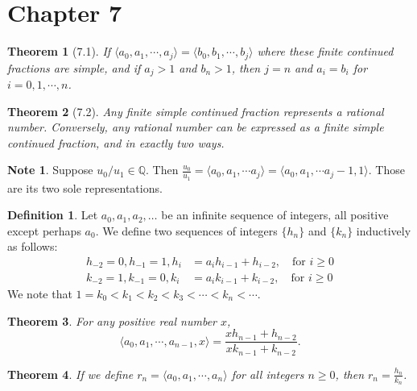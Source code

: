 \documentclass{amsart}
\newtheorem{theorem}{Theorem}
\theoremstyle{definition}
\newtheorem*{definition*}{Definition}
\newtheorem*{note*}{Note}
\begin{document}
\section*{Chapter 7}

\begin{theorem}[7.1]
  If
  $\langle a_0, a_1, \cdots, a_j \rangle 
  = \langle b_0, b_1, \cdots, b_j \rangle$
  where these finite continued fractions are simple,
  and if $a_j > 1$ and $b_n > 1$, then $j = n$ and
  $a_i = b_i$ for $i = 0, 1, \cdots, n$.
\end{theorem}

\begin{theorem}[7.2]
  Any finite simple continued fraction represents a rational 
  number. 
  Conversely, any rational number can be expressed as a finite
  simple continued fraction, and in exactly two ways. 
\end{theorem}

\begin{note*}
  Suppose $u_0 / u_1 \in \mathbb{Q}$.
  Then
  $\frac{u_0}{u_1} 
  = \langle a_0, a_1, \cdots a_j \rangle
  = \langle a_0, a_1, \cdots a_j - 1, 1 \rangle$.
  Those are its two sole representations.
\end{note*}

\begin{definition*}
  Let $a_0, a_1, a_2, \ldots$ be an infinite sequence
  of integers, all positive except perhaps $a_0$.
  We define two sequences of integers
  $\{ h_n \}$ and $\{ k_n \}$ inductively as follows:
  \begin{align*}
    h_{-2} = 0, h_{-1} = 1, h_i &= a_i h_{i-1} + h_{i-2}, 
      \quad \text{for $i \geq 0$} \\
      k_{-2} = 1, k_{-1} = 0, k_i &= a_i k_{i-1} + k_{i-2}, 
      \quad \text{for $i \geq 0$}
  \end{align*}
  We note that $1 = k_0 < k_1 < k_2 < k_3 < \cdots < k_n < \cdots$.
\end{definition*}

\begin{theorem}
  For any positive real number $x$,
  \[
    \langle a_0, a_1, \cdots, a_{n-1}, x \rangle
    = \frac{x h_{n-1} + h_{n-2}}{x k_{n-1} + k_{n-2}}.
 \]
\end{theorem}

\begin{theorem}
  If we define $r_n = \langle a_0, a_1, \cdots, a_n \rangle$
  for all integers $n \geq 0$, then 
  $r_n = \frac{h_n}{k_n}$.
\end{theorem}
\end{document}

